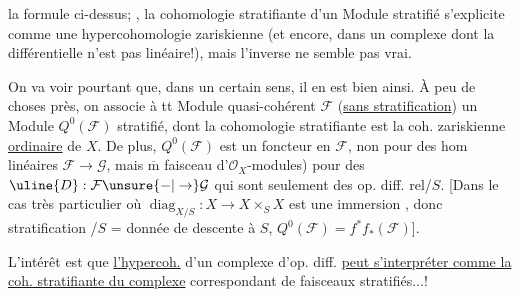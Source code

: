 la formule ci-dessus;
, la cohomologie stratifiante d'un Module stratifié s'explicite comme une hypercohomologie zariskienne (et encore, dans un complexe dont la  différentielle n'est pas linéaire!),  mais l'inverse ne semble pas vrai.

On va voir pourtant que, dans un certain sens, il en est bien ainsi.
À peu de choses près, on associe à tt Module quasi-cohérent $\mathcal{F}$ (\uline{sans stratification}) un Module   $Q^0(\mathcal{F})$ stratifié, dont la cohomologie stratifiante est la coh. zariskienne \uline{ordinaire} de $X$.
De plus, $Q^0(\mathcal{F})$ est un foncteur en $\mathcal{F}$, non  pour des hom linéaires $\mathcal{F}\to\mathcal{G}$, mais $\overline{\mathrm m}$   faisceau  d'$\mathcal{O}_X$-modules) pour des $\uline{D}:\mathcal{F}\unsure{\mathbin{-}|\to}\mathcal{G}$ qui sont seulement des op. diff. rel/$S$.
[Dans le cas très particulier où $\operatorname{diag}_{X/S}:X\longrightarrow X\times_S X$ est une immersion , donc  stratification /$S$ = donnée de descente à $S$, $Q^0(\mathcal{F})=f^*f_*(\mathcal{F})$].

L'intérêt  est que \uline{l'hypercoh.}  d'un complexe d'op. diff. \uline{peut s'interpréter comme la coh. stratifiante du complexe} correspondant de faisceaux stratifiés...!

